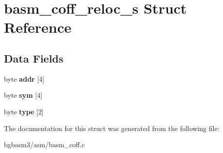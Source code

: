 \hypertarget{structbasm__coff__reloc__s}{\section{basm\-\_\-coff\-\_\-reloc\-\_\-s Struct Reference}
\label{structbasm__coff__reloc__s}
}
\subsection*{Data Fields}
\begin{DoxyCompactItemize}
\item 
\hypertarget{structbasm__coff__reloc__s_a5dacddc48669f811e050106786d782ba}{byte {\bfseries addr} \mbox{[}4\mbox{]}}\label{structbasm__coff__reloc__s_a5dacddc48669f811e050106786d782ba}

\item 
\hypertarget{structbasm__coff__reloc__s_a6d28c06875226163f6b427784a3681fe}{byte {\bfseries sym} \mbox{[}4\mbox{]}}\label{structbasm__coff__reloc__s_a6d28c06875226163f6b427784a3681fe}

\item 
\hypertarget{structbasm__coff__reloc__s_ab67966194829809ff9d189f57d2af6c9}{byte {\bfseries type} \mbox{[}2\mbox{]}}\label{structbasm__coff__reloc__s_ab67966194829809ff9d189f57d2af6c9}

\end{DoxyCompactItemize}


The documentation for this struct was generated from the following file\-:\begin{DoxyCompactItemize}
\item 
bgbasm3/asm/basm\-\_\-coff.\-c\end{DoxyCompactItemize}

